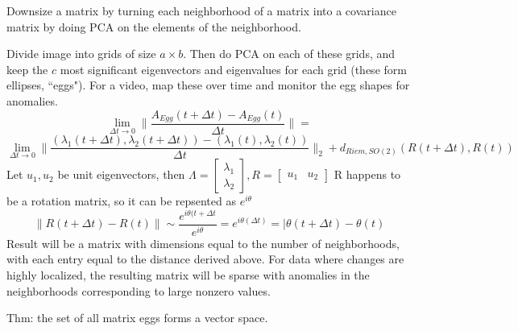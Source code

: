\documentclass[12pt,letterpaper]{letter}
\newcommand{\m}[1]{\begin{bmatrix}#1\end{bmatrix}}
\begin{document}
Downsize a matrix by turning each neighborhood of a matrix into a covariance matrix by doing PCA on the elements of the neighborhood.  

Divide image into grids of size $a\times b$.  Then do PCA on each of these grids, and keep the $c$ most significant eigenvectors and eigenvalues for each grid (these form ellipses, ``eggs").  For a video, map these over time and monitor the egg shapes for anomalies.  
\[\lim_{\Delta t\to 0} \|\frac{A_{Egg}(t+\Delta t)- A_{Egg}(t)}{\Delta t}\| =\]
\[ \lim_{\Delta t\to 0} \| \frac{(\lambda_1(t+\Delta t), \lambda_2(t+\Delta t))-(\lambda_1( t), \lambda_2(t))}{\Delta t}\|_2 + d_{Riem, SO(2)}(R(t+\Delta t),R(t))\]
Let $u_1,u_2$ be unit eigenvectors, then $\Lambda = \m{\lambda_1\\ \lambda_2}, R=\m{u_1 & u_2}$
R happens to be a rotation matrix, so it can be repsented as $e^{i\theta}$
\[\|R(t+\Delta t)-R(t)\| \sim \frac{e^{i\theta(t+\Delta t}}{e^{i\theta}} = e^{i\theta (\Delta t) }= |\theta(t+\Delta t) - \theta(t)\]
Result will be a matrix with dimensions equal to the number of neighborhoods, with each entry equal to the distance derived above.  For data where changes are highly localized, the resulting matrix will be sparse with anomalies in the neighborhoods corresponding to large nonzero values.

Thm: the set of all matrix eggs forms a vector space.
\end{document}

